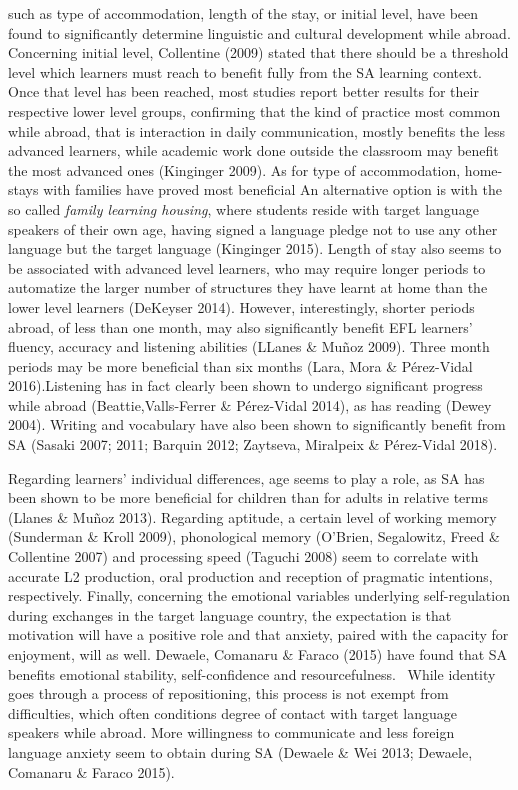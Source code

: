 \begin{styleStandard}
such as type of accommodation, length of the stay, or initial level, have been found to significantly determine linguistic and cultural development while abroad. Concerning initial level, Collentine (2009) stated that there should be a threshold level which learners must reach to benefit fully from the SA learning context. Once that level has been reached, most studies report better results for their respective lower level groups, confirming that the kind of practice most common while abroad, that is interaction in daily communication, mostly benefits the less advanced learners, while academic work done outside the classroom may benefit the most advanced ones (Kinginger 2009). As for type of accommodation, home-stays with families have proved most beneficial An alternative option is with the so called \textit{family learning housing}, where students reside with target language speakers of their own age, having signed a language pledge not to use any other language but the target language (Kinginger 2015). Length of stay also seems to be associated with advanced level learners, who may require longer periods to automatize the larger number of structures they have learnt at home than the lower level learners (DeKeyser 2014). However, interestingly, shorter periods abroad, of less than one month, may also significantly benefit EFL learners’ fluency, accuracy and listening abilities (LLanes \& Muñoz 2009). Three month periods may be more beneficial than six months (Lara, Mora \& Pérez-Vidal 2016).Listening has in fact clearly been shown to undergo significant progress while abroad (Beattie,Valls-Ferrer \& Pérez-Vidal 2014), as has reading (Dewey 2004). Writing and vocabulary have also been shown to significantly benefit from SA (Sasaki 2007; 2011; Barquin 2012; Zaytseva, Miralpeix \& Pérez-Vidal 2018).
\end{styleStandard}

\begin{styleStandard}
Regarding learners’ individual differences, age seems to play a role, as SA has been shown to be more beneficial for children than for adults in relative terms (Llanes \& Muñoz 2013). Regarding aptitude, a certain level of working memory (Sunderman \& Kroll 2009), phonological memory (O’Brien, Segalowitz, Freed \& Collentine 2007) and processing speed (Taguchi 2008) seem to correlate with accurate L2 production, oral production and reception of pragmatic intentions, respectively. Finally, concerning the emotional variables underlying self-regulation during exchanges in the target language country, the expectation is that motivation will have a positive role and that anxiety, paired with the capacity for enjoyment, will as well. Dewaele, Comanaru \& Faraco (2015) have found that SA benefits emotional stability, self-confidence and resourcefulness. \ While identity goes through a process of repositioning, this process is not exempt from difficulties, which often conditions degree of contact with target language speakers while abroad. More willingness to communicate and less foreign language anxiety seem to obtain during SA (Dewaele \& Wei 2013; Dewaele, Comanaru \& Faraco 2015). 
\end{styleStandard}

